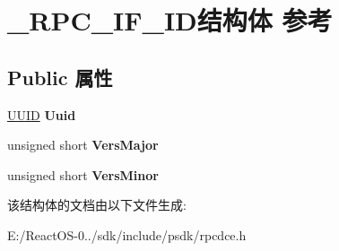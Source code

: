 \hypertarget{struct___r_p_c___i_f___i_d}{}\section{\+\_\+\+R\+P\+C\+\_\+\+I\+F\+\_\+\+I\+D结构体 参考}
\label{struct___r_p_c___i_f___i_d}
\subsection*{Public 属性}
\begin{DoxyCompactItemize}
\item 
\mbox{\label{struct___r_p_c___i_f___i_d_a588e9296eef7895818a0523eefc957fa}} 
\hyperlink{interface_g_u_i_d}{U\+U\+ID} {\bfseries Uuid}
\item 
\mbox{\label{struct___r_p_c___i_f___i_d_a21c25e768a7436ed59714bc16590b168}} 
unsigned short {\bfseries Vers\+Major}
\item 
\mbox{\label{struct___r_p_c___i_f___i_d_a8514283420dfafbd168dd051444cb85b}} 
unsigned short {\bfseries Vers\+Minor}
\end{DoxyCompactItemize}


该结构体的文档由以下文件生成\+:\begin{DoxyCompactItemize}
\item 
E\+:/\+React\+O\+S-\/0../sdk/include/psdk/rpcdce.\+h\end{DoxyCompactItemize}
